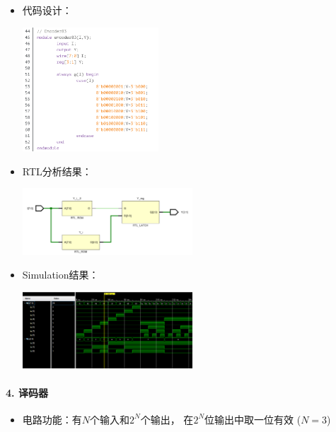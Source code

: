\documentclass[a4,10pt,zihao=-4]{ctexart}
\begin{document}
\begin{itemize}
\item
  代码设计：
  
  \includegraphics[width=0.4\textwidth]{ENCODER83_Code.png}
\item
  RTL分析结果：
  
  \includegraphics[width=0.5\textwidth]{ENCODER83_RTL.png}
\item
  Simulation结果：
  
  \includegraphics[width=0.5\textwidth]{ENCODER83_Simulation.png}
\end{itemize}

\paragraph{4. 译码器}

\begin{itemize}
\item
  电路功能：有\(N\)个输入和\(2^N\)个输出， 在\(2^N\)位输出中取一位有效
  (\(N=3\))
\end{itemize}
\end{document}
